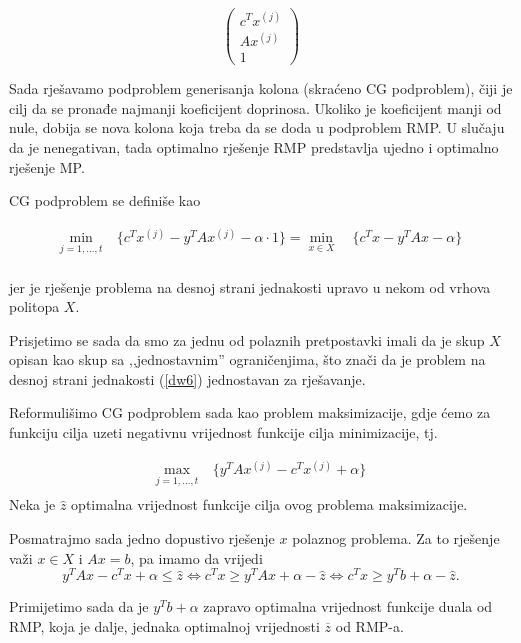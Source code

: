 \documentclass[b5paper, utf8, 11pt, colorlinks]{book}
\theoremstyle{definition}
\begin{document}
 $$\left(\begin{array}{c}
 	c^T x^{(j)}\\
 	A x^{(j)} \\
 	1 
 \end{array}\right)$$
 
 Sada rješavamo   podproblem generisanja kolona (skraćeno CG podproblem), čiji je cilj da se pronađe najmanji koeficijent doprinosa. Ukoliko je koeficijent manji od nule, dobija se nova kolona koja treba da se doda u podproblem RMP.  U slučaju da je nenegativan, tada  optimalno rješenje RMP predstavlja ujedno i optimalno rješenje MP.
 
 CG podproblem se definiše kao
 
      \begin{equation}
 	\begin{aligned}\label{dw6}
 		\min_{j=1,\ldots,t}\  & \{c^T x^{(j)} -y^T	Ax^{(j)}-\alpha\cdot 1\}=\min_{x\in X}\  & \{c^Tx-y^T	Ax-\alpha\}\\
 	\end{aligned}
 \end{equation}
 
jer je rješenje problema na desnoj strani jednakosti upravo u nekom od vrhova politopa $X$.

Prisjetimo se sada da smo za jednu od polaznih pretpostavki imali da je skup $X$ opisan kao skup sa ,,jednostavnim'' ograničenjima, što znači da je problem na desnoj strani jednakosti (\ref{dw6}) jednostavan za rješavanje.

Reformulišimo  CG podproblem sada kao problem maksimizacije, gdje ćemo za funkciju cilja uzeti negativnu vrijednost funkcije cilja minimizacije, tj.
 
 
       \begin{equation}
 	\begin{aligned}\label{dw7}
 		\max_{j=1,\ldots,t}\  &  \{y^T	Ax^{(j)}-c^Tx^{(j)}+\alpha\}\\
 	\end{aligned}
 \end{equation}
Neka je $\hat{z}$ optimalna vrijednost funkcije cilja ovog problema maksimizacije.

Posmatrajmo sada jedno dopustivo rješenje $x$ polaznog problema. Za to rješenje važi 
$x\in X$ i $Ax=b$, pa imamo da vrijedi %
 $$y^T	Ax-c^Tx+\alpha\leqslant \hat{z} \Leftrightarrow c^Tx\geqslant y^T	Ax+\alpha-\hat{z} \Leftrightarrow  c^T x \geqslant y^T b+\alpha-\hat{z}.$$
 
 Primijetimo sada da je  $y^T b+\alpha$ zapravo  optimalna vrijednost funkcije duala od RMP, koja je dalje, jednaka optimalnoj vrijednosti $\overline{z}$ od RMP-a. 
 
\end{document}
